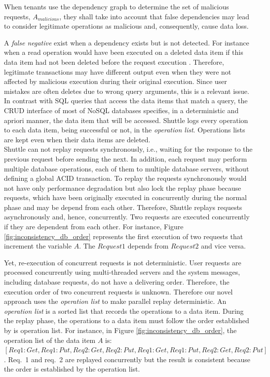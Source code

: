 When tenants use the dependency graph to determine the set of malicious requests, $A_{malicious}$, they shall take into account that false dependencies may lead to consider legitimate operations as malicious and, consequently, cause data loss.



A \emph{false negative} exist when a dependency exists but is not detected. For instance when a read operation would have been executed on a deleted data item if this data item had not been deleted before the request execution \cite{Xie2008}. Therefore, legitimate transactions may have different output even when they were not affected by malicious execution during their original execution. Since user mistakes are often deletes due to wrong query arguments, this is a relevant issue. In contrast with \ac{SQL} queries that access the data items that match a query, the \ac{CRUD} interface of most of \acs{NoSQL} databases specifies, in a deterministic and apriori manner, the data item that will be accessed. Shuttle logs every operation to each data item, being successful or not, in the \emph{operation list}. Operations lists are kept even when their data items are deleted.\\

Shuttle can not replay requests synchronously, i.e., waiting for the response to the previous request before sending the next. In addition, each request may perform multiple database operations, each of them to multiple database servers, without defining a global \ac{ACID} transaction. To replay the requests synchronously would not have only performance degradation but also lock the replay phase because requests, which have been originally executed in concurrently during the normal phase and may be depend from each other. Therefore, Shuttle replays requests asynchronously and, hence, concurrently. Two requests are executed concurrently if they are dependent from each other. For instance, Figure \ref{fig:inconsistency_db_order} represents the first execution of two requests that increment the variable $A$. The $Request 1$ depends from $Request 2$ and vice versa. 

Yet, re-execution of concurrent requests is not deterministic. User requests are processed concurrently using multi-threaded servers and the system messages, including database requests, do not have a delivering order. Therefore, the execution order of two concurrent requests is unknown. Therefore our novel approach uses the \emph{operation list} to make parallel replay deterministic. An \emph{operation list} is a sorted list that records the operations to a data item. During the replay phase, the operations to a data item must follow the order established by is operation list. For instance, in Figure \ref{fig:inconsistency_db_order}, the operation list of the data item $A$ is: $[Req1:Get, Req1:Put, Req2:Get, Req2:Put, Req1:Get, Req1:Put, Req2:Get, Req2:Put]$. {Req.~1} and {req.~2} are replayed concurrently but the result is consistent because the order is established by the operation list.

